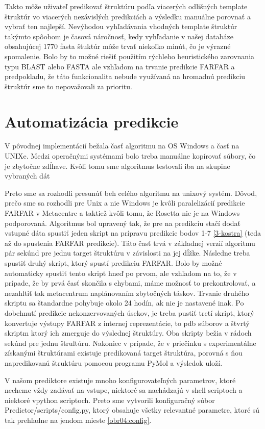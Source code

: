 \indent Takto môže uživateľ  predikovať štruktúru podľa viacerých odlišných template štruktúr vo viacerých nezávislých predikciách a výsledku manuálne porovnať a vybrať ten najlepší. Nevýhodou vyhľadávania vhodných template štruktúr takýmto spôobom je  časová náročnosť, kedy vyhľadanie v našej databáze obsahujúcej 1770 fasta štuktúr môže trvať niekoľko minút, čo je výrazné spomalenie. Bolo by to možné riešiť použitím rýchleho heuristického zarovnania typu BLAST alebo FASTA ale vzhľadom na trvanie predikcie FARFAR a predpokladu, že táto funkcionalita nebude využívaná na hromadnú predikciu štruktúr sme to nepovažovali za prioritu.


\section{Automatizácia predikcie}
V pôvodnej implementácií bežala časť algoritmu na OS Windows a časť na UNIXe. Medzi operačnými systémami bolo treba manuálne kopírovať súbory, čo je zbytočne zdĺhave. Kvôli tomu sme algoritmus testovali iba na skupine vybraných dát 

\indent Preto sme sa rozhodli presunúť beh celého algoritmu na unixový systém. Dôvod, prečo sme sa rozhodli pre Unix a nie Windows je kvôli paralelizácií predikcie FARFAR v Metacentre a taktiež kvôli tomu, že Rosetta nie je na Windows podporovaná. Algoritmus bol upravený tak, že pre na predikciu stačí dodať vstupné dáta spustiť jeden skript na prípravu predikcie bodov 1-7 \ref{3-kostra} (teda až do spustenia FARFAR predikcie). Táto časť trvá v základnej verzií algoritmu pár sekúnd pre jednu target štruktúru v závislosti na jej dĺžke.  Následne treba spustiť druhý skript, ktorý spustí predikciu FARFAR. Bolo by možné automaticky spustiť tento skript hneď po prvom, ale vzhľadom na to, že v prípade, že by prvá časť skončila s chybami, máme možnosť to prekontrolovať, a nezahltiť tak metacentrum naplánovaním zbytočných táskov. Trvanie druhého skriptu sa štandardne pohybuje okolo 24 hodín, ak nie je nastavené inak. Po dobehnutí predikcie nekonzervovaných úsekov, je treba pustiť tretí skript, ktorý konvertuje výstupy FARFAR z internej reprezentácie, to pdb súborov a štvrtý skriptm ktorý ich zmerguje do výslednej štruktúry. Oba skripty bežia v rádoch sekúnd pre jednu štrultúru. Nakoniec v prípade, že v priečinku s experimentálne získanými štruktúrami existuje predikovaná target štruktúra, porovná s ňou napredikovanú štruktúru pomocou programu PyMol a výsledok uloží.


\indent V našom prediktore existuje mnoho konfigurovateľných parametrov, ktoré necheme vždy zadávať na vstupe, niektoré sa nachádzajú v shell scriptoch a niektoré vpython scriptoch. Preto sme vytvorili konfiguračný súbor Predictor/scripts/config.py, ktorý obsahuje všetky relevantné parametre, ktoré sú tak prehľadne na jendom mieste \ref{obr04:config}.

